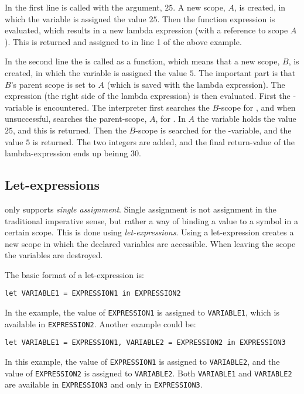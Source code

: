 
In the first line  is called with the argument, $25$. A new scope, $A$,
is created, in which the variable  is assigned the value $25$. Then the function
expression is evaluated, which results in a new lambda expression (with a reference to scope $A$).
This is returned and assigned to  in line 1 of the above example.

In the second line the  is called as a function, which means that a new scope, $B$,
is created, in which the variable  is assigned the value $5$. The important part is
that $B$'s parent scope is set to $A$ (which is saved with the lambda expression). The expression
(the right side of the lambda expression) is then evaluated. First the -variable is
encountered. The interpreter first searches the $B$-scope for , and when unsuccessful,
searches the parent-scope, $A$, for . In $A$ the variable  holds the value
$25$, and this is returned. Then the $B$-scope is searched for the -variable, and the value
$5$ is returned. The two integers are added, and the final return-value of the lambda-expression
ends up beinng $30$.

\subsection{Let-expressions}

\productname{} only supports \emph{single assignment}. Single assignment is not assignment
in the traditional imperative sense, but rather a way of binding a value to a symbol in a
certain scope. This is done using \emph{let-expressions}. Using a let-expression creates a
new scope in which the declared variables are accessible. When leaving the scope the
variables are destroyed.

The basic format of a let-expression is:

\texttt{let VARIABLE1 = EXPRESSION1 in EXPRESSION2}

In the example, the value of \texttt{EXPRESSION1} is assigned to \texttt{VARIABLE1}, which
is available in \texttt{EXPRESSION2}. Another example could be:

\texttt{let VARIABLE1 = EXPRESSION1, VARIABLE2 = EXPRESSION2 in EXPRESSION3}

In this example, the value of \texttt{EXPRESSION1} is assigned to \texttt{VARIABLE2}, and
the value of \texttt{EXPRESSION2} is assigned to \texttt{VARIABLE2}. Both \texttt{VARIABLE1}
and \texttt{VARIABLE2} are available in \texttt{EXPRESSION3} and only in \texttt{EXPRESSION3}.

